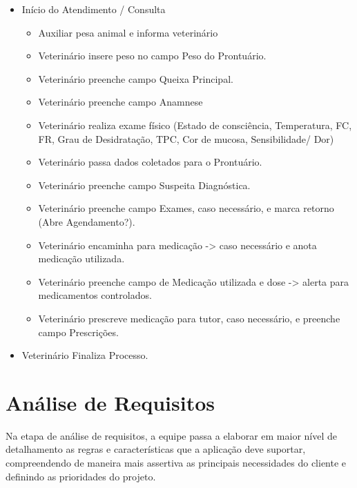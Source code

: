 \documentclass[
    12pt,               %
    openright,          %
    oneside,
    a4paper,            %
    BIBLATEX,           %
    TODO,               %
    english,            %
    brazil              %
    ]{ifsp-spo-inf-ctds}
\begin{document}
    \begin{itemize}
        \item Início do Atendimento / Consulta 

        \begin{itemize}
            \item Auxiliar pesa animal e informa veterinário
            \item Veterinário insere peso no campo Peso do Prontuário.
            \item Veterinário preenche campo Queixa Principal.
            \item Veterinário preenche campo Anamnese 
            \item Veterinário realiza exame físico (Estado de consciência, Temperatura, FC, FR, Grau de Desidratação, TPC, Cor de mucosa, Sensibilidade/ Dor)
            \item Veterinário passa dados coletados para o Prontuário.
            \item Veterinário preenche campo Suspeita Diagnóstica.
            \item Veterinário preenche campo Exames, caso necessário, e marca retorno (Abre Agendamento?).
            \item Veterinário encaminha para medicação -> caso necessário e anota medicação utilizada.
            \item Veterinário preenche campo de Medicação utilizada e dose -> alerta para medicamentos controlados.
            \item Veterinário prescreve medicação para tutor, caso necessário, e preenche campo Prescrições.
                        
        \end{itemize}
        \item Veterinário Finaliza Processo.
    \end{itemize}

	
  



     
    \section{Análise de Requisitos}
    
        Na etapa de análise de requisitos, a equipe passa a elaborar em maior nível de detalhamento as regras e características que a aplicação deve suportar, compreendendo de maneira mais assertiva as principais necessidades do cliente e definindo as prioridades do projeto.
        
\end{document}
